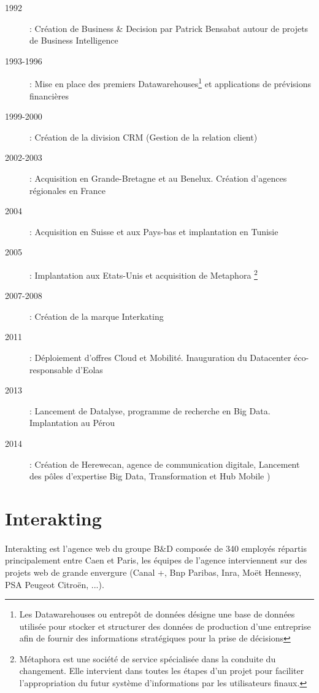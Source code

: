        	  \begin{description}
       	  \item[]
       	  \item[1992] : Création de Business \& Decision par Patrick Bensabat autour de projets de Business Intelligence
       	  \item[1993-1996] : Mise en place des premiers Datawarehouses\footnote{Les Datawarehouses ou entrepôt de données désigne une base de données utilisée pour stocker et structurer des données de production d'une entreprise afin de fournir des informations stratégiques pour la prise de décisions} et applications de prévisions financières
       	  \item[1999-2000] : Création de la division CRM (Gestion de la relation client)
       	  \item[2002-2003] : Acquisition en Grande-Bretagne et au Benelux. Création d'agences régionales en France
       	  \item[2004] : Acquisition en Suisse et aux Pays-bas et implantation en Tunisie
       	  \item[2005] : Implantation aux Etats-Unis et acquisition de Metaphora \footnote{Métaphora est une société de service spécialisée dans la conduite du changement. Elle intervient dans toutes les étapes d’un projet pour faciliter l'appropriation du futur système d’informations par les utilisateurs finaux.}
       	  \item[2007-2008] : Création de la marque Interkating
       	  \item[2011] : Déploiement d'offres Cloud et Mobilité. Inauguration du Datacenter éco-responsable d'Eolas
       	  \item[2013] : Lancement de Datalyse, programme de recherche en Big Data. Implantation au Pérou
       	  \item[2014] : Création de Herewecan, agence de communication digitale, Lancement des pôles d'expertise Big Data, Transformation et Hub Mobile )
       	  \item[]       	  
       	  \end{description}
       	  
\section{Interakting}

        \paragraph{}
        Interakting est l'agence web du groupe B\&D  composée de 340 employés répartis principalement entre Caen et Paris, les équipes de l'agence interviennent sur des projets web  de grande envergure (Canal +, Bnp Paribas, Inra, Moët Hennessy, PSA Peugeot Citroën, ...).
